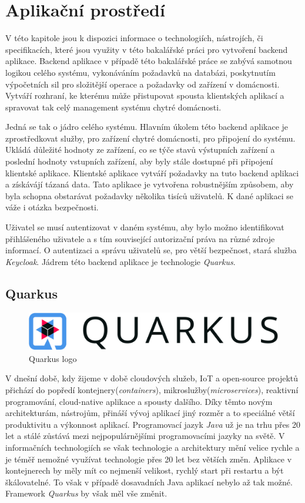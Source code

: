 \newpage
\section{Aplikační prostředí}
\label{terminy:app_prostredi}
V této kapitole jsou k dispozici informace o technologiích, nástrojích, či specifikacích, které jsou využity v této bakalářské práci pro vytvoření backend aplikace.
Backend aplikace v případě této bakalářské práce se zabývá samotnou logikou celého systému, vykonáváním požadavků na databázi, poskytnutím výpočetních sil pro složitější operace a požadavky od zařízení v domácnosti.
Vytváří rozhraní, ke kterému může přistupovat spousta klientských aplikací a spravovat tak celý management systému chytré domácnosti.

Jedná se tak o jádro celého systému.
Hlavním úkolem této backend aplikace je zprostředkovat služby, pro zařízení chytré domácnosti, pro připojení do systému. Ukládá důležité hodnoty ze zařízení, co se týče stavů výstupních zařízení a poslední hodnoty vstupních zařízení, aby byly stále dostupné při připojení klientské aplikace.
Klientské aplikace vytváří požadavky na tuto backend aplikaci a získávájí tázaná data. Tato aplikace je vytvořena robustnějším způsobem, aby byla schopna obstarávat požadavky několika tisíců uživatelů.
K dané aplikaci se váže i otázka bezpečnosti.

Uživatel se musí autentizovat v daném systému, aby bylo možno identifikovat přihlášeného uživatele a s tím související autorizační práva na různé zdroje informací.
O autentizaci a správu uživatelů se, pro větší bezpečnost, stará služba \emph{Keycloak}. Jádrem této backend aplikace je technologie \emph{Quarkus}.

\subsection{Quarkus}
\label{app_prostredi:quarkus}

\begin{figure}[!ht]
  \centering
  \includegraphics[width=.45 \linewidth]{obrazky-figures/quarkus_logo.png}
  \caption{Quarkus logo}
  \label{figure:quarkus_logo}
\end{figure}

V dnešní době, kdy žijeme v době cloudových služeb, IoT a open-source projektů přichází do popředí kontejnery(\emph{containers}), mikroslužby(\emph{microservices}), reaktivní programování, cloud-native aplikace a spousty dalšího.
Díky těmto novým architekturám, nástrojům, přináší vývoj aplikací jiný rozměr a to speciálné větší produktivitu a výkonnost aplikací. Programovací jazyk \emph{Java} už je na trhu přes 20 let a stálé zůstává mezi nejpopulárnějšími programovacími jazyky na světě.
V informačních technologiích se však technologie a architektury mění velice rychle a je téměř nemožné využívat technologie přes 20 let bez větších změn. Aplikace v kontejnerech by měly mít co nejmenší velikost, rychlý start při restartu a být škálovatelné.
To však v případě dosavadních Java aplikací nebylo až tak možné. Framework \emph{Quarkus} by však měl vše změnit.

